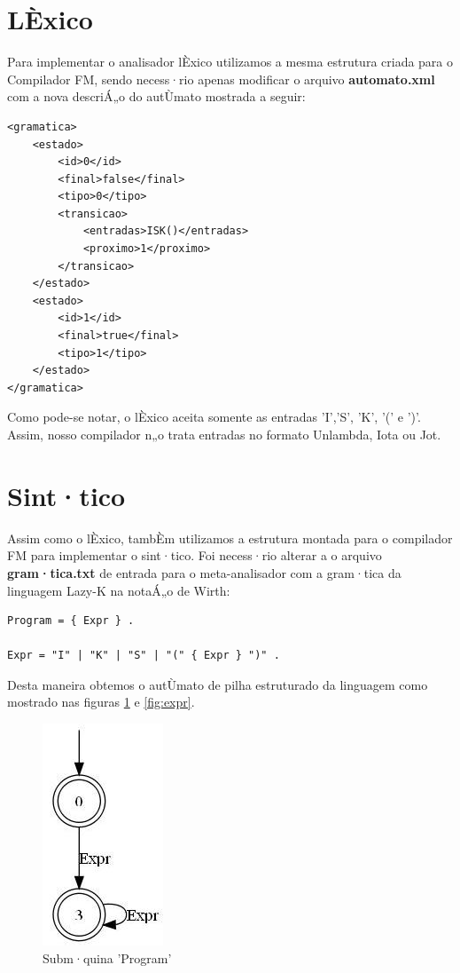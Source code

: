 \documentclass[12pt,a4paper]{article}
\begin{document}
\section{LÈxico}
Para implementar o analisador lÈxico utilizamos a mesma estrutura criada para o Compilador FM, sendo necess·rio apenas modificar o arquivo \textbf{automato.xml} com a nova descriÁ„o do autÙmato mostrada a seguir:

\lstset{language=XML, basicstyle=\footnotesize}
\begin{lstlisting}
<gramatica>
	<estado>
		<id>0</id>
		<final>false</final>
		<tipo>0</tipo>
		<transicao>
			<entradas>ISK()</entradas>
			<proximo>1</proximo>
		</transicao>
	</estado>
	<estado>
		<id>1</id>
		<final>true</final>
		<tipo>1</tipo>
	</estado>
</gramatica>
\end{lstlisting} 

Como pode-se notar, o lÈxico aceita somente as entradas 'I','S', 'K', '(' e ')'. Assim, nosso compilador n„o trata entradas no formato Unlambda, Iota ou Jot.

\section{Sint·tico}
Assim como o lÈxico, tambÈm utilizamos a estrutura montada para o compilador FM para implementar o sint·tico.
Foi necess·rio alterar a o arquivo \textbf{gram·tica.txt} de entrada para o meta-analisador com a gram·tica da linguagem Lazy-K na notaÁ„o de Wirth:

\lstset{language=C, basicstyle=\footnotesize}
\begin{lstlisting}
Program = { Expr } .

Expr = "I" | "K" | "S" | "(" { Expr } ")" .
\end{lstlisting}

Desta maneira obtemos o autÙmato de pilha estruturado da linguagem como mostrado nas figuras \ref{fig:program} e \ref{fig:expr}.

\begin{figure}[ht!]
	\begin{center}
		\includegraphics[scale=0.60]{program.jpg}
		\caption{Subm·quina 'Program'}
		\label{fig:program}
	\end{center}
\end{figure}
\end{document}
